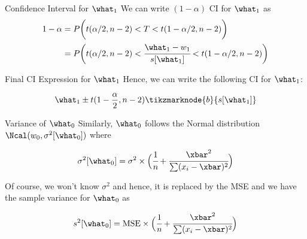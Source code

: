 \documentclass[aspectratio=169,xcolor=dvipsnames,svgnames,x11names,fleqn]{beamer}
\begin{document}
    \begin{frame}{Confidence Interval for $\what_1$}
    We can write $(1-\alpha)$ CI for $\what_1$ as
    \begin{equation}
    \begin{aligned}
        1 - \alpha & = P \bigg( t(\alpha/2, n - 2) < T < t(1- \alpha/2, n - 2) \bigg)\\
        & = P \bigg( t(\alpha/2, n - 2) <   \cfrac{\what_1 - w_1}{s[\what_1]}< t(1- \alpha/2, n - 2) \bigg)
    \end{aligned}
    \end{equation}
    \end{frame}
    
    \begin{frame}{Final CI Expression for $\what_1$}
    Hence, we can write the following CI for $\what_1$:
    \begin{gradblock}{}
    {\Huge
    \begin{equation}
    {
        \what_1 \pm t(1- \frac{\alpha}{2}, n - 2)\tikzmarknode{b}{s[\what_1 ]}
    }
    \end{equation}
    }
    \end{gradblock}
    \end{frame}
    
    \begin{frame}{Variance of $\what_0$}
    Similarly, $\what_0$ follows the Normal distribution $\Ncal(w_0, \sigma^2[\what_0])$ where
    
    \begin{equation}
        \sigma^2[\what_0] = \sigma^2 \times \Big( \cfrac{1}{n} + \cfrac{\xbar^2}{\sum (x_i - \xbar)^2} \Big)
    \end{equation}
    
    Of course, we won't know $\sigma^2$ and hence, it is replaced by the MSE and we have the sample variance for $\what_0$ as
    
    \begin{equation}
        s^2[\what_0] = \textrm{MSE} \times \Big( \cfrac{1}{n} + \cfrac{\xbar^2}{\sum (x_i - \xbar)^2} \Big)
    \end{equation}
    \end{frame}
    
\end{document}

